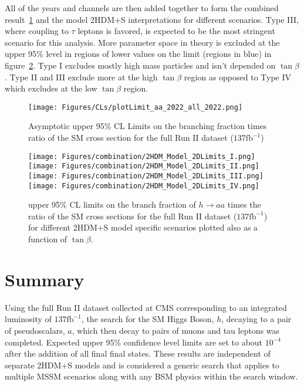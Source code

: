 \clearpage

All of the years and channels are then added together to form the combined result~\ref{fig:CLsRunII} and the model 2HDM+S interpretations for different scenarios. Type III, where coupling to $\tau$ leptons is favored, is expected to be the most stringent scenario for this analysis. More parameter space in theory is excluded at the upper 95\% level in regions of lower values on the limit (regions in blue) in figure~\ref{fig:2HDM}. Type I excludes mostly high mass particles and isn't depended on $\tan\beta$. Type II and III exclude more at the high $\tan\beta$ region as opposed to Type IV which excludes at the low $\tan\beta$ region.

\begin{figure}[ht!b]
\label{fig:CLsRunII} 
\centering
  \texttt{[image: Figures/CLs/plotLimit\_aa\_2022\_all\_2022.png]}
    \caption{Asymptotic upper 95\% CL Limits on the branching fraction times ratio of the SM cross section for the full Run II dataset ($\text{137}\text{fb}^{-1}$)}
\end{figure}

\begin{figure}[ht!b]
  \centering
  \texttt{[image: Figures/combination/2HDM\_Model\_2DLimits\_I.png]}
  \texttt{[image: Figures/combination/2HDM\_Model\_2DLimits\_II.png]}\\
  \texttt{[image: Figures/combination/2HDM\_Model\_2DLimits\_III.png]}
  \texttt{[image: Figures/combination/2HDM\_Model\_2DLimits\_IV.png]}\\
    \caption{\label{fig:2HDM}  upper 95\% CL limits on the branch fraction of $h\rightarrow a a $ times the ratio of the SM cross sections for the full Run II dataset ($\text{137}\text{fb}^{-1}$) for different 2HDM+S model specific scenarios plotted also as a function of $\tan\beta$.}
\end{figure}

\clearpage

\section{Summary}
\label{sec:sum}
Using the full Run II dataset collected at CMS corresponding to an integrated luminosity of $\text{137}\text{fb}^{-1}$, the search for the SM Higgs Boson, $h$, decaying to a pair of pseudoscalars, $a$, which then decay to pairs of muons and tau leptons was completed. 
Expected upper 95\% confidence level limits are set to about $10^{-4}$ after the addition of all final final states. 
These results are independent of separate 2HDM+S models and is considered a generic search that applies to multiple MSSM scenarios along with any BSM physics within the search window. 



